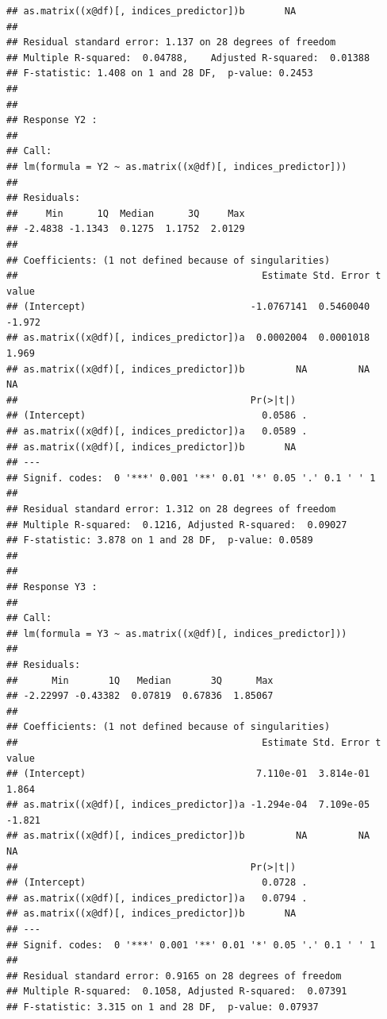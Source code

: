 \documentclass{article}\usepackage[]{graphicx}\usepackage[]{color}
\makeatletter
\newenvironment{kframe}{%
 \def\at@end@of@kframe{}%
 \ifinner\ifhmode%
  \def\at@end@of@kframe{\end{minipage}}%
  \begin{minipage}{\columnwidth}%
 \fi\fi%
 \def\FrameCommand##1{\hskip\@totalleftmargin \hskip-\fboxsep
 \colorbox{shadecolor}{##1}\hskip-\fboxsep
     \hskip-\linewidth \hskip-\@totalleftmargin \hskip\columnwidth}%
 \MakeFramed {\advance\hsize-\width
   \@totalleftmargin\z@ \linewidth\hsize
   \@setminipage}}%
 {\par\unskip\endMakeFramed%
 \at@end@of@kframe}
\newenvironment{knitrout}{}{} %
\makeatother
\begin{document}
\begin{knitrout}
\begin{kframe}
\begin{verbatim}
## as.matrix((x@df)[, indices_predictor])b       NA
## 
## Residual standard error: 1.137 on 28 degrees of freedom
## Multiple R-squared:  0.04788,	Adjusted R-squared:  0.01388 
## F-statistic: 1.408 on 1 and 28 DF,  p-value: 0.2453
## 
## 
## Response Y2 :
## 
## Call:
## lm(formula = Y2 ~ as.matrix((x@df)[, indices_predictor]))
## 
## Residuals:
##     Min      1Q  Median      3Q     Max 
## -2.4838 -1.1343  0.1275  1.1752  2.0129 
## 
## Coefficients: (1 not defined because of singularities)
##                                           Estimate Std. Error t value
## (Intercept)                             -1.0767141  0.5460040  -1.972
## as.matrix((x@df)[, indices_predictor])a  0.0002004  0.0001018   1.969
## as.matrix((x@df)[, indices_predictor])b         NA         NA      NA
##                                         Pr(>|t|)  
## (Intercept)                               0.0586 .
## as.matrix((x@df)[, indices_predictor])a   0.0589 .
## as.matrix((x@df)[, indices_predictor])b       NA  
## ---
## Signif. codes:  0 '***' 0.001 '**' 0.01 '*' 0.05 '.' 0.1 ' ' 1
## 
## Residual standard error: 1.312 on 28 degrees of freedom
## Multiple R-squared:  0.1216,	Adjusted R-squared:  0.09027 
## F-statistic: 3.878 on 1 and 28 DF,  p-value: 0.0589
## 
## 
## Response Y3 :
## 
## Call:
## lm(formula = Y3 ~ as.matrix((x@df)[, indices_predictor]))
## 
## Residuals:
##      Min       1Q   Median       3Q      Max 
## -2.22997 -0.43382  0.07819  0.67836  1.85067 
## 
## Coefficients: (1 not defined because of singularities)
##                                           Estimate Std. Error t value
## (Intercept)                              7.110e-01  3.814e-01   1.864
## as.matrix((x@df)[, indices_predictor])a -1.294e-04  7.109e-05  -1.821
## as.matrix((x@df)[, indices_predictor])b         NA         NA      NA
##                                         Pr(>|t|)  
## (Intercept)                               0.0728 .
## as.matrix((x@df)[, indices_predictor])a   0.0794 .
## as.matrix((x@df)[, indices_predictor])b       NA  
## ---
## Signif. codes:  0 '***' 0.001 '**' 0.01 '*' 0.05 '.' 0.1 ' ' 1
## 
## Residual standard error: 0.9165 on 28 degrees of freedom
## Multiple R-squared:  0.1058,	Adjusted R-squared:  0.07391 
## F-statistic: 3.315 on 1 and 28 DF,  p-value: 0.07937
\end{verbatim}
\end{kframe}
\end{knitrout}
\end{document}
